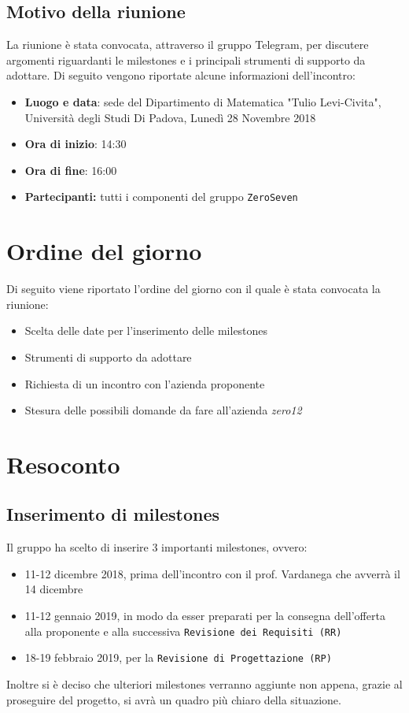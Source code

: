 \documentclass[a4paper,12pt]{article}
\begin{document}
	\subsection{Motivo della riunione}
	La riunione è stata convocata, attraverso il gruppo Telegram, per discutere argomenti riguardanti le milestones e i principali strumenti di supporto da adottare.
	Di seguito vengono riportate alcune informazioni dell'incontro:
	\begin{itemize}
		\item \textbf{Luogo e data}: sede del Dipartimento di Matematica "Tulio Levi-Civita", Università degli Studi Di Padova, Lunedì 28 Novembre 2018
		\item \textbf{Ora di inizio}: 14:30
		\item \textbf{Ora di fine}: 16:00
		\item \textbf{Partecipanti: } tutti i componenti del gruppo \texttt{ZeroSeven} 
	\end{itemize}
	\section{Ordine del giorno}
	Di seguito viene riportato l'ordine del giorno con il quale è stata convocata la riunione:
	\begin{itemize}
		\item Scelta delle date per l'inserimento delle milestones
		\item Strumenti di supporto da adottare
		\item Richiesta di un incontro con l'azienda proponente
		\item Stesura delle possibili domande da fare all'azienda \textit{zero12}
	\end{itemize}
	\section{Resoconto}
	\subsection{Inserimento di milestones}
	Il gruppo ha scelto di inserire 3 importanti milestones, ovvero:
	\begin{itemize}
		\item 11-12 dicembre 2018, prima dell'incontro con il prof. Vardanega che avverrà il 14 dicembre
		\item 11-12 gennaio 2019, in modo da esser preparati per la consegna dell'offerta alla proponente e alla successiva \texttt{Revisione dei Requisiti (RR)}
		\item 18-19 febbraio 2019, per la \texttt{Revisione di Progettazione (RP)}
	\end{itemize}
	Inoltre si è deciso che ulteriori milestones verranno aggiunte non appena, grazie al proseguire del progetto, si avrà un quadro più chiaro della situazione.
\end{document}
